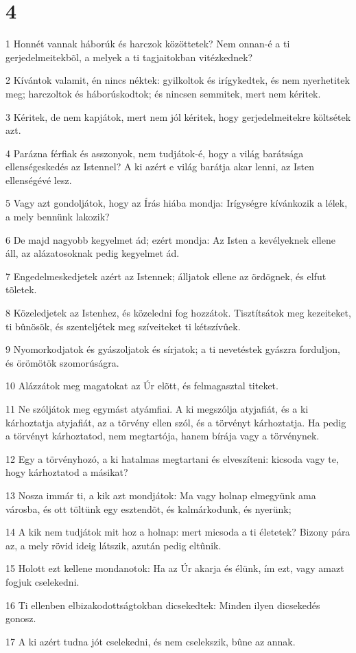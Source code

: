 \chapter{4}

\par 1 Honnét vannak háborúk és harczok közöttetek? Nem onnan-é a ti gerjedelmeitekbõl, a melyek a ti tagjaitokban vitézkednek?
\par 2 Kívántok valamit, én nincs néktek: gyilkoltok és irígykedtek, és nem nyerhetitek meg; harczoltok és háborúskodtok; és nincsen semmitek, mert nem kéritek.
\par 3 Kéritek, de nem kapjátok, mert nem jól kéritek, hogy gerjedelmeitekre költsétek azt.
\par 4 Parázna férfiak és asszonyok, nem tudjátok-é, hogy a világ barátsága ellenségeskedés az Istennel? A ki azért e világ barátja akar lenni, az Isten ellenségévé lesz.
\par 5 Vagy azt gondoljátok, hogy az Írás hiába mondja: Irígységre kívánkozik a lélek, a mely bennünk lakozik?
\par 6 De majd nagyobb kegyelmet ád; ezért mondja: Az Isten a kevélyeknek ellene áll, az alázatosoknak pedig kegyelmet ád.
\par 7 Engedelmeskedjetek azért az Istennek; álljatok ellene az ördögnek, és elfut tõletek.
\par 8 Közeledjetek az Istenhez, és közeledni fog  hozzátok. Tisztítsátok meg kezeiteket, ti bûnösök, és szenteljétek meg szíveiteket ti kétszívûek.
\par 9 Nyomorkodjatok és gyászoljatok és sírjatok; a ti nevetéstek gyászra forduljon, és örömötök szomorúságra.
\par 10 Alázzátok meg magatokat az Úr elõtt, és felmagasztal titeket.
\par 11 Ne szóljátok meg egymást atyámfiai. A ki megszólja atyjafiát, és a ki kárhoztatja atyjafiát, az a törvény ellen szól, és a törvényt kárhoztatja. Ha pedig a törvényt kárhoztatod, nem megtartója, hanem bírája vagy a törvénynek.
\par 12 Egy a törvényhozó, a ki hatalmas megtartani és elveszíteni: kicsoda vagy te, hogy kárhoztatod a másikat?
\par 13 Nosza immár ti, a kik azt mondjátok: Ma vagy holnap elmegyünk ama városba, és ott töltünk egy esztendõt, és kalmárkodunk, és nyerünk;
\par 14 A kik nem tudjátok mit hoz a holnap: mert micsoda a ti életetek? Bizony pára az, a mely rövid ideig látszik, azután pedig eltûnik.
\par 15 Holott ezt kellene mondanotok: Ha az Úr akarja és élünk, ím ezt, vagy amazt fogjuk cselekedni.
\par 16 Ti ellenben elbizakodottságtokban dicsekedtek: Minden ilyen dicsekedés gonosz.
\par 17 A ki azért tudna jót cselekedni, és nem cselekszik, bûne az annak.

